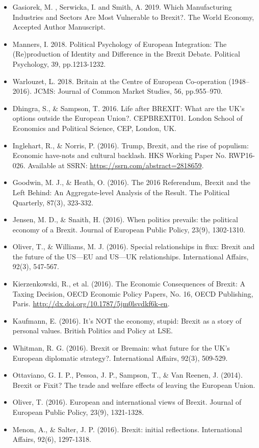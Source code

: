 \begin{itemize}
	\item Gasiorek, M. , Serwicka, I. and Smith, A. 2019. Which Manufacturing Industries and Sectors Are Most Vulnerable to Brexit?. The World Economy, Accepted Author Manuscript.
	\item Manners, I. 2018. Political Psychology of European Integration: The (Re)production of Identity and Difference in the Brexit Debate. Political Psychology, 39, pp.1213-1232.
	\item Warlouzet, L. 2018. Britain at the Centre of European Co-operation (1948–2016). JCMS: Journal of Common Market Studies, 56, pp.955–970.
	\item Dhingra, S., \& Sampson, T. 2016. Life after BREXIT: What are the UK’s options outside the European Union?. CEPBREXIT01. London School of Economics and Political Science, CEP, London, UK.
	\item Inglehart, R., \& Norris, P. (2016). Trump, Brexit, and the rise of populism: Economic have-nots and cultural backlash. HKS Working Paper No. RWP16-026. Available at SSRN: \url{https://ssrn.com/abstract=2818659}.
	\item Goodwin, M. J., \& Heath, O. (2016). The 2016 Referendum, Brexit and the Left Behind: An Aggregate-level Analysis of the Result. The Political Quarterly, 87(3), 323-332.
	\item Jensen, M. D., \& Snaith, H. (2016). When politics prevails: the political economy of a Brexit. Journal of European Public Policy, 23(9), 1302-1310.
	\item Oliver, T., \& Williams, M. J. (2016). Special relationships in flux: Brexit and the future of the US—EU and US—UK relationships. International Affairs, 92(3), 547-567.
	\item Kierzenkowski, R., et al.  (2016). The Economic Consequences of Brexit: A Taxing Decision, OECD Economic Policy Papers, No. 16, OECD Publishing, Paris.
	\url{http://dx.doi.org/10.1787/5jm0lsvdkf6k-en}.
	\item Kaufmann, E. (2016). It’s NOT the economy, stupid: Brexit as a story of personal values. British Politics and Policy at LSE.
	\item Whitman, R. G. (2016). Brexit or Bremain: what future for the UK's European diplomatic strategy?. International Affairs, 92(3), 509-529.
	\item Ottaviano, G. I. P., Pessoa, J. P., Sampson, T., \& Van Reenen, J. (2014). Brexit or Fixit? The trade and welfare effects of leaving the European Union.
	\item Oliver, T. (2016). European and international views of Brexit. Journal of European Public Policy, 23(9), 1321-1328.
	\item Menon, A., \& Salter, J. P. (2016). Brexit: initial reflections. International Affairs, 92(6), 1297-1318.
\end{itemize}


